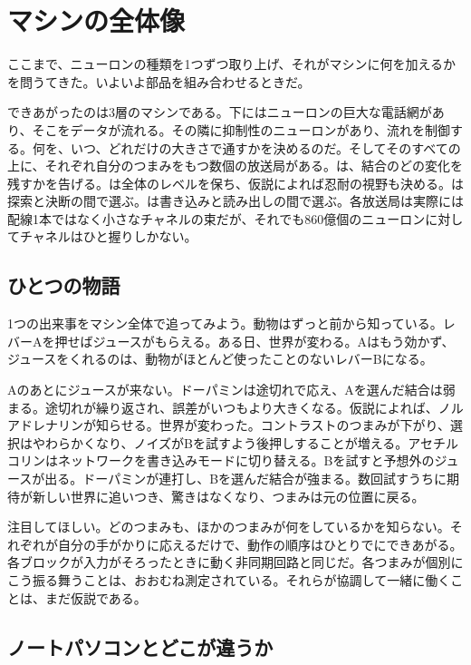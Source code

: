 \chapter{マシンの全体像}


ここまで、ニューロンの種類を1つずつ取り上げ、それがマシンに何を加えるかを問うてきた。いよいよ部品を組み合わせるときだ。

できあがったのは3層のマシンである。下にはニューロンの巨大な電話網があり、そこをデータが流れる。その隣に抑制性のニューロンがあり、流れを制御する。何を、いつ、どれだけの大きさで通すかを決めるのだ。そしてそのすべての上に、それぞれ自分のつまみをもつ数個の放送局がある。は、結合のどの変化を残すかを告げる。は全体のレベルを保ち、仮説によれば忍耐の視野も決める。は探索と決断の間で選ぶ。は書き込みと読み出しの間で選ぶ。各放送局は実際には配線1本ではなく小さなチャネルの束だが、それでも860億個のニューロンに対してチャネルはひと握りしかない。

\section*{ひとつの物語}

1つの出来事をマシン全体で追ってみよう。動物はずっと前から知っている。レバーAを押せばジュースがもらえる。ある日、世界が変わる。Aはもう効かず、ジュースをくれるのは、動物がほとんど使ったことのないレバーBになる。

Aのあとにジュースが来ない。ドーパミンは途切れで応え、Aを選んだ結合は弱まる。途切れが繰り返され、誤差がいつもより大きくなる。仮説によれば、ノルアドレナリンが知らせる。世界が変わった。コントラストのつまみが下がり、選択はやわらかくなり、ノイズがBを試すよう後押しすることが増える。アセチルコリンはネットワークを書き込みモードに切り替える。Bを試すと予想外のジュースが出る。ドーパミンが連打し、Bを選んだ結合が強まる。数回試すうちに期待が新しい世界に追いつき、驚きはなくなり、つまみは元の位置に戻る。

注目してほしい。どのつまみも、ほかのつまみが何をしているかを知らない。それぞれが自分の手がかりに応えるだけで、動作の順序はひとりでにできあがる。各ブロックが入力がそろったときに動く非同期回路と同じだ。各つまみが個別にこう振る舞うことは、おおむね測定されている。それらが協調して一緒に働くことは、まだ仮説である。

\section*{ノートパソコンとどこが違うか}

